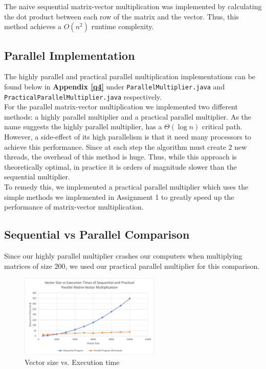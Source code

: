 \documentclass{article}%
\newcommand{\bigO}[1]{$O(#1)$}
\begin{document}
        The naive sequential matrix-vector multiplication was implemented by calculating the dot product between each row of the matrix and the vector. Thus, this method achieves a \bigO{n^2} runtime complexity. 
    
    \subsection{Parallel Implementation}
        The highly parallel and practical parallel multiplication implementations can be found below in \textbf{Appendix \ref{q4}} under \texttt{ParallelMultiplier.java} and \texttt{PracticalParallelMultiplier.java} respectively.\\
        
        For the parallel matrix-vector multiplication we implemented two different methods: a highly parallel multiplier and a practical parallel multiplier. As the name suggests the highly parallel multiplier, has a $\Theta(\log{n})$ critical path. However, a side-effect of its high parallelism is that it need many processors to achieve this performance. Since at each step the algorithm must create 2 new threads, the overhead of this method is huge. Thus, while this approach is theoretically optimal, in practice it is orders of magnitude slower than the sequential multiplier.\\
        
        To remedy this, we implemented a practical parallel multiplier which uses the simple methods we implemented in Assignment 1 to greatly speed up the performance of matrix-vector multiplication. 
        
    
    \subsection{Sequential vs Parallel Comparison}
        Since our highly parallel multiplier crashes our computers when multiplying matrices of size 200, we used our practical parallel multiplier for this comparison.\\
        
        \begin{figure}[H]
            \centering
            \includegraphics[width=0.6\textwidth]{images/times.png}
            \caption{Vector size vs. Execution time}
        \end{figure}
        \FloatBarrier
        
\end{document}
